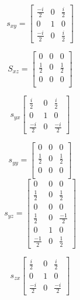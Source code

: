 \documentclass[12pt]{article}
\begin{document}
\begin{equation}
s_{xy} = 
\begin{bmatrix}
\frac{-i}{2} & 0  & \frac{i}{2} \\ 
0           & 1 & 0\\
\frac{-i}{2} & 0  & \frac{i}{2} 
\end{bmatrix}
\end{equation}

\begin{equation}
S_{xz} = 
\begin{bmatrix}
0           & 0 & 0\\
\frac{1}{2} & 0  & \frac{1}{2} \\ 
0           & 0 & 0\\
\end{bmatrix}
\end{equation}


\begin{equation}
s_{yx}
\begin{bmatrix}
\frac{i}{2} & 0  & \frac{i}{2} \\ 
0           & 1 & 0\\
\frac{-i}{2} & 0  & \frac{-i}{2} 
\end{bmatrix}
\end{equation}

\begin{equation}
s_{yy} = 
\begin{bmatrix}
0           & 0 & 0\\
\frac{1}{2} & 0  & \frac{1}{2} \\ 
0           & 0 & 0\\
\end{bmatrix}
\end{equation}
\begin{equation}
s_{yz} = 
\begin{bmatrix}
0           & 0 & 0\\
\frac{1}{2} & 0  & \frac{1}{2} \\ 
0           & 0 & 0\\


\frac{1}{2}  & 0  & \frac{-1}{2} \\ 
0            & 1  & 0\\
\frac{-1}{2} & 0  & \frac{1}{2} 
\end{bmatrix}
\end{equation}

\begin{equation}
s_{zx}
\begin{bmatrix}
\frac{i}{2} & 0  & \frac{i}{2} \\ 
0           & 1 & 0\\
\frac{-i}{2} & 0  & \frac{-i}{2} 
\end{bmatrix}
\end{equation}
\end{document}
